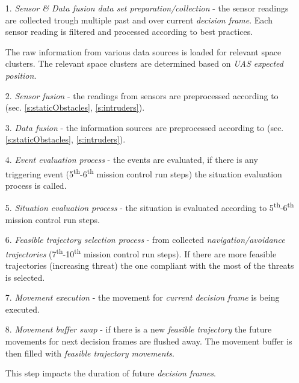 \begin{itemize}
    \item[1.] \emph{Sensor \& Data fusion data set preparation/collection} - the sensor readings are collected trough multiple past and over current \emph{decision frame}. Each sensor reading is filtered and processed according to best practices. 
    
    The raw information from various data sources is loaded for relevant space clusters. The relevant space clusters are determined based on \emph{UAS expected position}. 
    
    \item[2.] \emph{Sensor fusion} - the readings from sensors are preprocessed according to (sec. \ref{s:staticObstacles}, \ref{s:intruders}).
    
    \item[3.] \emph{Data fusion} - the information sources are preprocessed according to (sec. \ref{s:staticObstacles}, \ref{s:intruders}).
    
    \item[4.] \emph{Event evaluation process} - the events are evaluated, if there is any triggering event (5\textsuperscript{th}-6\textsuperscript{th} mission control run steps) the situation evaluation process is called.
    
    \item[5.] \emph{Situation evaluation process} - the situation is evaluated according to 5\textsuperscript{th}-6\textsuperscript{th} mission control run steps.
    
    \item[6.] \emph{Feasible trajectory selection process} - from collected \emph{navigation/avoidance trajectories} (7\textsuperscript{th}-10\textsuperscript{th} mission control run steps). If there are more feasible trajectories (increasing threat) the one compliant with the most of the threats is selected.
    
    \item[7.] \emph{Movement execution} - the movement for \emph{current decision frame} is being executed.
    
    \item[8.] \emph{Movement buffer swap} - if there is a new \emph{feasible trajectory} the future movements for next decision frames are flushed away. The movement buffer is then filled with \emph{feasible trajectory movements}.
    \begin{note}
        This step impacts the duration of future \emph{decision frames}.
    \end{note}
\end{itemize}